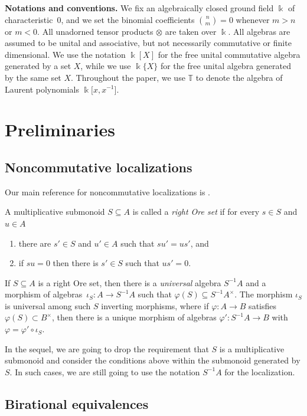 \documentclass[pdftex]{sigma}
\newcommand{\B}[1]{\mathbb{#1}}
\numberwithin{equation}{section}
\begin{document}
{\bf Notations and conventions.}
We fix an algebraically closed ground field $\Bbbk$ of characteristic~0, and we set the binomial
coefficients $\binom{n}{m}=0$ whenever $m>n$ or $m<0$. All unadorned tensor products $\otimes$ are
taken over $\Bbbk$. All algebras are assumed to be unital and associative, but not necessarily
commutative or finite dimensional. We use the notation $\Bbbk[X]$ for the free unital commutative
algebra generated by a set $X$, while we use $\Bbbk\{X\}$ for the free unital algebra generated by
the same set $X$. Throughout the paper, we use $\B{T}$ to denote the algebra of Laurent polynomials
$\Bbbk\big[x,x^{-1}\big]$.

\section{Preliminaries}\label{sect:prelims}

\subsection{Noncommutative localizations}

Our main reference for noncommutative localizations is \cite[Section~10]{Lam:Lectures}.

A multiplicative submonoid $S\subseteq A$ is called a \emph{right Ore set} if for every
$s\in S$ and $u\in A$
\begin{enumerate}\itemsep=0pt
\item[(i)] there are $s'\in S$ and $u'\in A$ such that $su'=us'$, and
\item[(ii)] if $su=0$ then there is $s'\in S$ such that $us'=0$.
\end{enumerate}

If $S\subseteq A$ is a right Ore set, then there is a \emph{universal} algebra $S^{-1}A$ and a
morphism of algebras~${\iota_S\colon A\to S^{-1}}A$ such that $\varphi(S)\subseteq S^{-1}A^\times$. The
morphism $\iota_S$ is universal among such $S$ inverting morphisms, where if $\varphi\colon A\to B$
satisfies $\varphi(S)\subset B^\times$, then there is a unique morphism of algebras
$\varphi'\colon S^{-1}A\to B$ with $\varphi = \varphi'\circ \iota_S$.

In the sequel, we are going to drop the requirement that $S$ is a multiplicative submonoid and
consider the conditions above within the submonoid generated by $S$. In such cases, we are still
going to use the notation $S^{-1}A$ for the localization.

\subsection{Birational equivalences}
\end{document}
